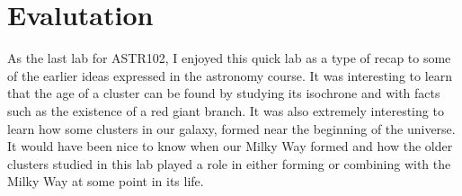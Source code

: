 \documentclass{article}
\begin{document}
\begin{enumerate}
\end{enumerate}




\section{Evalutation}

As the last lab for ASTR102, I enjoyed this quick lab as a type of recap to some
of the earlier ideas expressed in the astronomy course. It was interesting to learn
that the age of a cluster can be found by studying its isochrone and with facts such
as the existence of a red giant branch. It was also extremely interesting to learn
how some clusters in our galaxy, formed near the beginning of the universe. It would
have been nice to know when our Milky Way formed and how the older clusters studied
in this lab played a role in either forming or combining with the Milky Way at some
point in its life.
\end{document}
